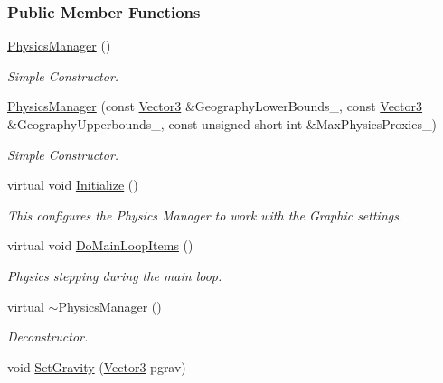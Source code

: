 \subsubsection*{Public Member Functions}
\begin{DoxyCompactItemize}
\item 
\hyperlink{classphys_1_1PhysicsManager_ab3ecdc295799ad9858ca80743b25006d}{PhysicsManager} ()
\begin{DoxyCompactList}\small\item\em Simple Constructor. \item\end{DoxyCompactList}\item 
\hyperlink{classphys_1_1PhysicsManager_a1072c647c64ec82381ddc9f1a17c5909}{PhysicsManager} (const \hyperlink{classphys_1_1Vector3}{Vector3} \&GeographyLowerBounds\_\-, const \hyperlink{classphys_1_1Vector3}{Vector3} \&GeographyUpperbounds\_\-, const unsigned short int \&MaxPhysicsProxies\_\-)
\begin{DoxyCompactList}\small\item\em Simple Constructor. \item\end{DoxyCompactList}\item 
virtual void \hyperlink{classphys_1_1PhysicsManager_a28885be750bb763d957f122593815388}{Initialize} ()
\begin{DoxyCompactList}\small\item\em This configures the Physics Manager to work with the Graphic settings. \item\end{DoxyCompactList}\item 
virtual void \hyperlink{classphys_1_1PhysicsManager_a62741a2582ac9bfd0255cf8a3ad2310c}{DoMainLoopItems} ()
\begin{DoxyCompactList}\small\item\em Physics stepping during the main loop. \item\end{DoxyCompactList}\item 
virtual \hyperlink{classphys_1_1PhysicsManager_a4898702f889c6b4aa7c0b59991d310b0}{$\sim$PhysicsManager} ()
\begin{DoxyCompactList}\small\item\em Deconstructor. \item\end{DoxyCompactList}\item 
void \hyperlink{classphys_1_1PhysicsManager_a3e74f3e0288706d44dc90657a8fa1118}{SetGravity} (\hyperlink{classphys_1_1Vector3}{Vector3} pgrav)

\end{DoxyCompactItemize}
